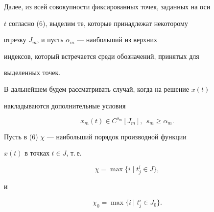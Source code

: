 Далее, из всей совокупности фиксированных точек, заданных на оси


$t$ согласно (6), выделим те, которые принадлежат некоторому


отрезку $J_m$, и пусть $\alpha_m$ --- наибольший из верхних


индексов, который встречается среди обозначений, принятых для


выделенных точек.





В дальнейшем будем рассматривать случай, когда на решение $x(t)$


накладываются дополнительные условия


\begin{equation}


x_m(t)\in C^{s_m}[J_m],\ \ s_m\geq \alpha_m.


\end{equation}





Пусть в (6) $\chi$ --- наибольший порядок производной функции


$x(t)$ в точках $t\in J$, т.\,е.


\begin{equation}


\chi=\max \{i\mid t_j^i \in J\},


\end{equation}


и


\begin{equation}


\chi_0=\max \{i\mid t_j^i \in J_0\}.


\end{equation}





